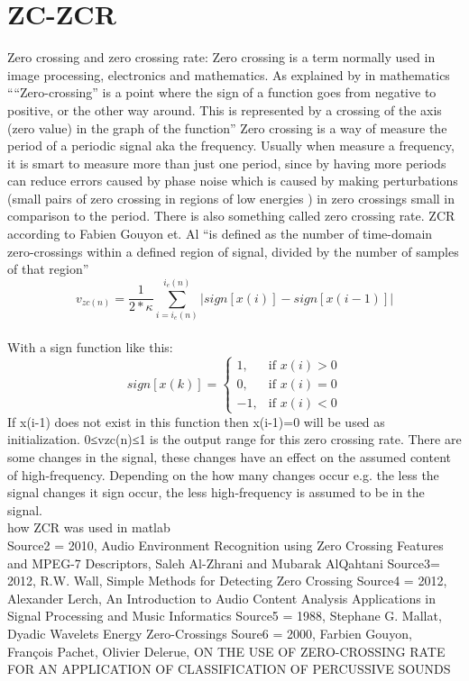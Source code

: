 \section{ZC-ZCR}

Zero crossing and zero crossing rate:
Zero crossing is a term normally used in image processing, electronics and mathematics. As explained by \citep{AlZhrani2010}  in mathematics ““Zero-crossing” is a point where the sign of a function goes from negative to positive, or the other way around. This is represented by a crossing of the axis (zero value) in the graph of the function” \citep{AlZhrani2010}
Zero crossing is a way of measure the period of a periodic signal aka the frequency.\citep{RWW2012}  Usually when measure a frequency, it is smart to measure more than just one period, since by having more periods can reduce errors caused by phase noise which is caused by making perturbations (small pairs of zero crossing in regions of low energies \citep{Mallat1988} ) in zero crossings small in comparison to the period. \citep{RWW2012}
There is also something called zero crossing rate. ZCR according to Fabien Gouyon et. Al “is defined as the number of time-domain zero-crossings within a defined region of signal, divided by the number of samples of that region” \citep{Gouyon2000}
\\
\begin{equation}\label{eq:ZCR}
v_{zc(n)}= \frac{1}{2* \kappa}\sum_{i=i_e(n)}^{i_e (n)}|sign[x(i)]-sign[x(i-1)]|
\end{equation}
\\
With a sign function like this:
\begin{equation}
sign[x(k)]=
\begin{cases}
 1, & \text{if } x(i)>0\\ 
 0, & \text{if } x(i)=0\\
-1, & \text{if } x(i)<0
\end{cases}
\end{equation}
If x(i-1) does not exist in this function then x(i-1)=0 will be used as initialization. 
0≤vzc(n)≤1 is the output range for this zero crossing rate. There are some changes in the signal, these changes have an effect on the assumed content of high-frequency. Depending on the how many changes occur e.g. the less the signal changes it sign occur, the less high-frequency is assumed to be in the signal. \citep{AlZhrani2010} 
\\
how ZCR was used in matlab
\\
Source2 = 2010, Audio Environment Recognition using Zero Crossing Features and MPEG-7 Descriptors, Saleh Al-Zhrani and Mubarak AlQahtani
Source3= 2012, R.W. Wall, Simple Methods for Detecting Zero Crossing 
Source4 = 2012, Alexander Lerch, An Introduction to Audio Content Analysis Applications in Signal Processing and Music Informatics
Source5 = 1988, Stephane G. Mallat, Dyadic Wavelets Energy Zero-Crossings
Soure6 = 2000, Farbien Gouyon, François Pachet, Olivier Delerue, ON THE USE OF ZERO-CROSSING RATE FOR AN APPLICATION OF CLASSIFICATION OF PERCUSSIVE SOUNDS  